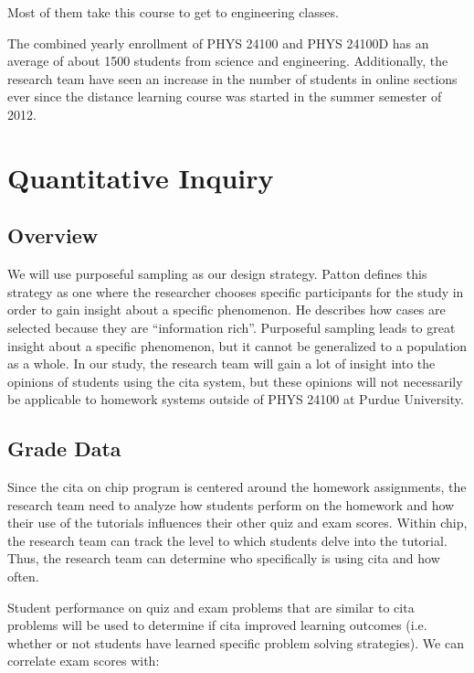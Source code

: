 Most of them take this course to get to engineering classes.

The combined yearly enrollment of PHYS 24100 and PHYS 24100D has an average of about 1500 students from science and engineering. Additionally, the research team have seen an increase in the number of students in online sections ever since the distance learning course was started in the summer semester of 2012.

\section{Quantitative Inquiry}

\subsection{Overview}

We will use purposeful sampling as our design strategy. Patton defines this strategy as one where the researcher chooses specific participants for the study in order to gain insight about a specific phenomenon. He describes how cases are selected because they are ``information rich''. Purposeful sampling leads to great insight about a specific phenomenon, but it cannot be generalized to a population as a whole\cite{patton2015}. In our study, the research team will gain a lot of insight into the opinions of students using the \gls{cita} system, but these opinions will not necessarily be applicable to homework systems outside of PHYS 24100 at Purdue University.

\subsection{Grade Data}

Since the \gls{cita} on \gls{chip} program is centered around the homework assignments, the research team need to analyze how students perform on the homework and how their use of the tutorials influences their other quiz and exam scores. Within \gls{chip}, the research team can track the level to which students delve into the tutorial. Thus, the research team can determine who specifically is using \gls{cita} and how often.

Student performance on quiz and exam problems that are similar to \gls{cita} problems will be used to determine if \gls{cita} improved learning outcomes (i.e. whether or not students have learned specific problem solving strategies). We can correlate exam scores with:

